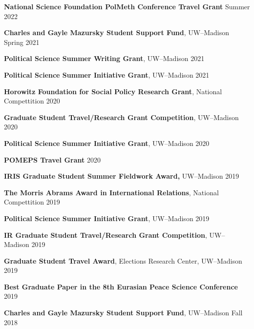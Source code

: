 \documentclass[11pt]{article}
\begin{document}
\textbf{National Science Foundation PolMeth Conference Travel Grant} \hfill  Summer 2022 \vspace{.01in}

\textbf{Charles and Gayle Mazursky Student Support Fund}, UW--Madison \hfill  Spring 2021 \vspace{.01in}

\textbf{Political Science Summer Writing Grant}, UW--Madison \hfill 2021\vspace{.01in}

\textbf{Political Science Summer Initiative Grant}, UW--Madison \hfill 2021\vspace{.01in}

\textbf{Horowitz Foundation for Social Policy Research Grant}, National Compettition \hfill 2020\vspace{.01in}

\textbf{Graduate Student Travel/Research Grant Competition}, UW--Madison \hfill 2020\vspace{.01in}

\textbf{Political Science Summer Initiative Grant}, UW--Madison \hfill 2020\vspace{.01in}

\textbf{POMEPS Travel Grant} \hfill 2020\vspace{.01in}

\textbf{IRIS Graduate Student Summer Fieldwork Award,} UW--Madison \hfill 2019\vspace{.01in}

\textbf{The Morris Abrams Award in International Relations}, National Compettition \hfill 2019\vspace{.01in}

\textbf{Political Science Summer Initiative Grant}, UW--Madison \hfill 2019\vspace{.01in}

\textbf{IR Graduate Student Travel/Research Grant Competition}, UW--Madison \hfill 2019\vspace{.01in}

\textbf{Graduate Student Travel Award}, Elections Research Center, UW--Madison \hfill  2019\vspace{.01in}

\textbf{Best Graduate Paper in the 8th Eurasian Peace Science Conference} \hfill  2019\vspace{.01in}

\textbf{Charles and Gayle Mazursky Student Support Fund}, UW--Madison \hfill  Fall 2018\vspace{.01in}
\end{document}
